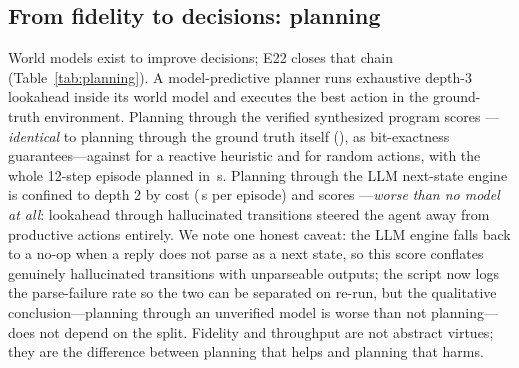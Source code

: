 \documentclass[11pt]{article}
\begin{document}
\subsection{From fidelity to decisions: planning}\label{sec:planning}
World models exist to improve decisions; E22 closes that chain
(Table~\ref{tab:planning}). A model-predictive planner runs exhaustive
depth-3 lookahead inside its world model and executes the best action in the
ground-truth environment. Planning through the verified synthesized program
scores \PlanCode---\emph{identical} to planning through the ground truth
itself (\PlanOracle), as bit-exactness guarantees---against \PlanReactive{}
for a reactive heuristic and \PlanRandom{} for random actions, with the
whole 12-step episode planned in \PlanCodeSeconds\,s. Planning through the
LLM next-state engine is confined to depth 2 by cost (\PlanLLMSeconds\,s per
episode) and scores \PlanLLM---\emph{worse than no model at all}: lookahead
through hallucinated transitions steered the agent away from productive
actions entirely. We note one honest caveat: the LLM engine falls back to a
no-op when a reply does not parse as a next state, so this score conflates
genuinely hallucinated transitions with unparseable outputs; the script now
logs the parse-failure rate so the two can be separated on re-run, but the
qualitative conclusion---planning through an unverified model is worse than not
planning---does not depend on the split. Fidelity and throughput are not
abstract virtues; they are the difference between planning that helps and
planning that harms.

\begin{table}[htb]\centering\small

\caption{E22: model-predictive lookahead on the sprint world, plans executed
in the ground-truth environment. Value function: shipped $-$ bugs $-$
0.5$\cdot$debt after 12 steps.}
\label{tab:planning}
\end{table}
\end{document}
